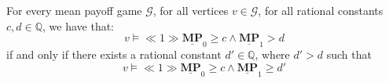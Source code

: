 \begin{lemma}
    \label{ConjGrtIsGrtEq}
    For every mean payoff game $\mathcal{G}$, for all vertices $v \in \mathcal{G}$, for all rational constants $c, d \in \mathbb{Q}$, we have that:
    \begin{equation*}
        v \models \ll 1 \gg \underline{\mathbf{MP}}_0 \geqslant c \land \underline{\mathbf{MP}}_1 > d
    \end{equation*}
    if and only if there exists a rational constant $d' \in \mathbb{Q}$, where $d' > d$ such that
    \begin{equation*}
        v \models \ll 1 \gg \underline{\mathbf{MP}}_0 \geqslant c \land \underline{\mathbf{MP}}_1 \geqslant d'
    \end{equation*}
\end{lemma}

